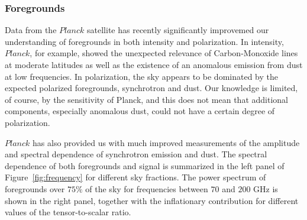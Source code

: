 \subsubsection{Foregrounds}
Data from the $Planck$ satellite has recently significantly improvemed our understanding of foregrounds in both intensity and polarization. In intensity, $Planck$, for example, showed the unexpected relevance of Carbon-Monoxide lines at moderate latitudes as well as the existence of an anomalous emission from dust at low frequencies. In polarization, the sky appears to be dominated by the expected polarized foregrounds, synchrotron and dust. Our knowledge is limited, of course, by the sensitivity of Planck, and this does not mean that additional components, especially anomalous dust, could not have a certain degree of polarization. 

$Planck$ has also provided us with much improved measurements of the amplitude and spectral dependence of synchrotron emission and dust. The spectral dependence of both foregrounds and signal is summarized in the left panel of Figure~\ref{fig:frequency} for different sky fractions. The power spectrum of foregrounds over $75\%$ of the sky for frequencies between $70$ and $200$ GHz is shown in the right panel, together with the inflationary contribution for different values of the tensor-to-scalar ratio.

